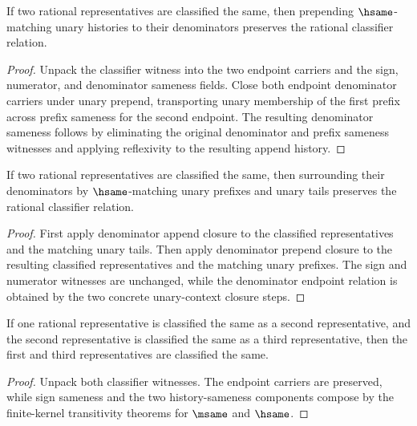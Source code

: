 \begin{theorem}
\label{thm:rat-classifier-prepend-unary-denominators-closed}
If two rational representatives are classified the same, then prepending
\(\hsame\)-matching unary histories to their denominators preserves the
rational classifier relation.
\end{theorem}
\begin{proof}
Unpack the classifier witness into the two endpoint carriers and the sign,
numerator, and denominator sameness fields. Close both endpoint denominator
carriers under unary prepend, transporting unary membership of the first prefix
across prefix sameness for the second endpoint. The resulting denominator
sameness follows by eliminating the original denominator and prefix sameness
witnesses and applying reflexivity to the resulting append history.
\end{proof}

\begin{theorem}
\label{thm:rat-classifier-append-unary-denominator-context-closed}
If two rational representatives are classified the same, then surrounding their
denominators by $\hsame$-matching unary prefixes and unary tails preserves the
rational classifier relation.
\end{theorem}
\begin{proof}
First apply denominator append closure to the classified representatives and
the matching unary tails. Then apply denominator prepend closure to the
resulting classified representatives and the matching unary prefixes. The sign
and numerator witnesses are unchanged, while the denominator endpoint relation
is obtained by the two concrete unary-context closure steps.
\end{proof}

\begin{theorem}
\label{thm:rat-classifier-transitivity}
If one rational representative is classified the same as a second representative, and the second representative is classified the same as a third representative, then the first and third representatives are classified the same.
\end{theorem}
\begin{proof}
Unpack both classifier witnesses. The endpoint carriers are preserved, while sign sameness and the two history-sameness components compose by the finite-kernel transitivity theorems for \(\msame\) and \(\hsame\).
\end{proof}

